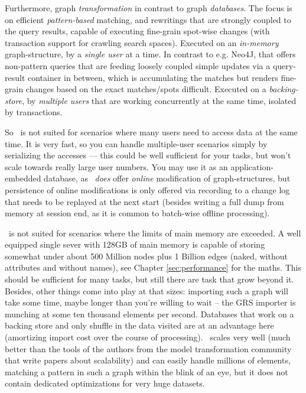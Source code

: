 Furthermore, graph \emph{transformation} in contrast to graph \emph{databases}.
The focus is on efficient \emph{pattern-based} matching, and rewritings that are strongly coupled to the query results, capable of executing fine-grain spot-wise changes (with transaction support for crawling search spaces). 
Executed on an \emph{in-memory} graph-structure, by a \emph{single user} at a time.
In contrast to e.g. Neo4J\cite{neo}, that offers non-pattern queries that are feeding loosely coupled simple updates via a query-result container in between, which is accumulating the matches but renders fine-grain changes based on the exact matches/spots difficult.
Executed on a \emph{backing-store}, by \emph{multiple users} that are working concurrently at the same time, isolated by transactions.

So \GrG\ is not suited for scenarios where many users need to access data at the same time. 
It is very fast, so you can handle multiple-user scenarios simply by serializing the accesses --- this could be well sufficient for your tasks, but won't scale towards really large user numbers.
You may use it as an application-embedded database, as
\GrG\ \emph{does} offer \emph{online} modification of graph-structures,
but persistence of online modifications is only offered via recording to a change log that needs to be replayed at the next start
(besides writing a full dump from memory at session end, as it is common to batch-wise offline processing).

\GrG\ is not suited for scenarios where the limits of main memory are exceeded.
A well equipped single sever with 128GB of main memory is capable of storing somewhat under about 500 Million nodes plus 1 Billion edges (naked, without attributes and without names), see Chapter \ref{sec:performance} for the maths.
This should be sufficient for many tasks, but still there are task that grow beyond it.
Besides, other things come into play at that sizes: importing such a graph will take some time, maybe longer than you're willing to wait -- the GRS importer is munching at some ten thousand elements per second.
Databases that work on a backing store and only shuffle in the data visited are at an advantage here (amortizing import cost over the course of processing).
\GrG\ scales very well (much better than the tools of the authors from the model transformation community that write papers about scalability) and can easily handle millions of elements, matching a pattern in such a graph within the blink of an eye, but it does not contain dedicated optimizations for very huge datasets.

